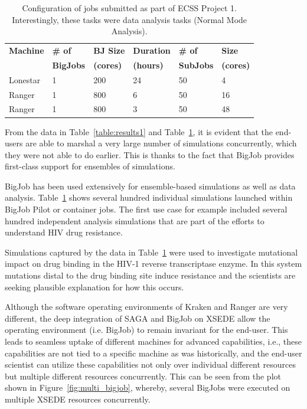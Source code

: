 \documentclass{sig-alternate}
\begin{document}
\begin{table}[h]
\begin{center}
\begin{tabular}{p{1.1cm}p{1.2cm}p{1.2cm}p{1.2cm}p{1.1cm}p{0.8cm}}
\toprule
\textbf{Machine}  & 
\textbf{\# of}    &
\textbf{BJ Size}     & 
\textbf{Duration} & 
\textbf{\# of}    &
\textbf{Size}     \\
                  &
\textbf{BigJobs}  &
\textbf{(cores)} &
\textbf{(hours)}  &
\textbf{SubJobs}  &
\textbf{(cores)} 
                  \\ \midrule
Lonestar & 1 &  200 & 24 &  50 &  4 \\ \midrule
Ranger   & 1 &  800 &  6 &  50 & 16 \\ \midrule
Ranger   & 1 &  800 &  3 &  50 & 48 \\ \bottomrule
\end{tabular}
\caption{Configuration of jobs submitted as part of ECSS Project
  1. Interestingly, these tasks were data analysis tasks (Normal Mode
  Analysis).}
\label{table:results}
\end{center}
 \end{table}

From the data in Table~\ref{table:results1} and
Table~\ref{table:results}, it is evident that the end-users are able
to marshal a very large number of simulations concurrently, which
they were not able to do earlier. This is thanks to the fact that
BigJob provides first-class support for ensembles of simulations.

BigJob has been used extensively for ensemble-based simulations as well as data
analysis. Table~\ref{table:results} shows several hundred individual simulations
launched within BigJob Pilot or container jobs. The first use case for example
included several hundred independent analysis simulations that are part of the
efforts to understand HIV drug resistance.

Simulations captured by the data in Table~\ref{table:results} were
used to investigate mutational impact on drug binding in the HIV-1
reverse transcriptase enzyme. In this system mutations distal to the
drug binding site induce resistance and the scientists are seeking
plausible explanation for how this occurs.

Although the software operating environments of Kraken and Ranger are
very different, the deep integration of SAGA and BigJob on
XSEDE allow the operating environment (i.e. BigJob) to remain
invariant for the end-user. 
This leads to seamless uptake of different machines for
advanced capabilities, i.e., these capabilities are not tied to a
specific machine as was historically, and the end-user scientist can
utilize these capabilities not only over individual different
resources but multiple different resources concurrently. This can be
seen from the plot shown in Figure~\ref{fig:multi_bigjob}, whereby,
several BigJobs were executed on multiple XSEDE resources
concurrently.
\end{document}
